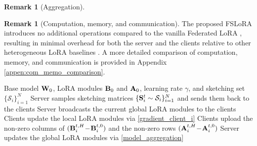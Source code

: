 \documentclass{article} %
\theoremstyle{plain}
\theoremstyle{definition}
\newtheorem{remark}[theorem]{Remark}
\begin{document}
\begin{remark}[Aggregation]
\end{remark}

\begin{remark}[Computation, memory, and communication]\label{remark:commnucation} 
The proposed FSLoRA introduces no additional operations compared to the vanilla Federated LoRA \citep{zhang2024towards}, resulting in minimal overhead for both the server and the clients relative to other heterogeneous LoRA baselines \citep{bai2024federatedfinetuninglargelanguage,wang2024flora}.
A more detailed comparison of computation, memory, and communication is provided in Appendix \ref{appen:com_memo_comparison}.
\end{remark}

\begin{algorithm}[t]
\caption{Federated Sketching LoRA (FSLoRA)}
\label{alo_flora}
\begin{algorithmic}[1]
\REQUIRE Base model ${\bf W}_0$, LoRA modules ${\bf B}_0$ and ${\bf A}_0$, learning rate $\gamma$, and sketching set $\{\mathcal{S}_i\}_{i=1}^{N}$
    \STATE Server samples sketching matrices $\{{\bf S}_i^t \sim \mathcal{S}_i \}_{i=1}^{N}$ and sends them back to the clients
    \STATE Server broadcasts the current global LoRA modules to the clients
        \STATE Clients update the local LoRA modules via \eqref{gradient_client_i}
    \ENDFOR
    \STATE Clients upload the non-zero columns of $({\bf B}_i^{t,H} \!-\! {\bf B}_i^{t,0})$ and the non-zero rows $({\bf A}_i^{t,H} \!-\! {\bf A}_i^{t,0})$
    \STATE Server updates the global LoRA modules via \eqref{model_aggregation}
\ENDFOR
\end{algorithmic}
\end{algorithm}
\end{document}
